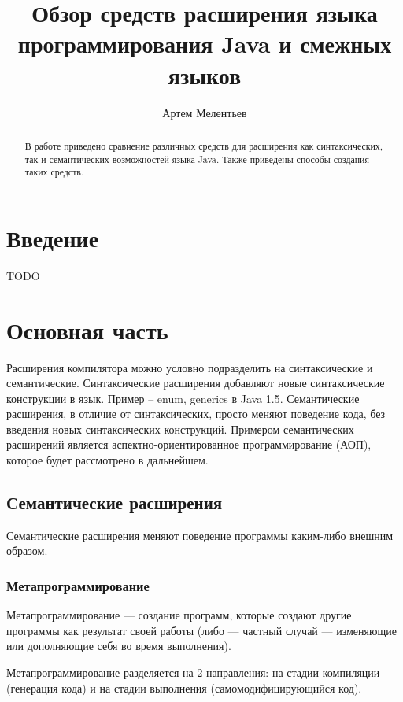 \documentclass[a4paper,12pt]{article}
\begin{document}
\title{Обзор средств расширения языка программирования Java и смежных языков}
\author{Артем Мелентьев}
\maketitle

\begin{abstract}
В работе приведено сравнение различных средств для расширения как
синтаксических, так и семантических возможностей языка Java. Также приведены
способы создания таких средств.
\end{abstract}

\tableofcontents

\section{Введение}

TODO

\section{Основная часть}

Расширения компилятора можно условно подразделить на синтаксические и
семантические. Синтаксические расширения добавляют новые синтаксические
конструкции в язык. Пример – enum, generics в Java 1.5. Семантические
расширения, в отличие от синтаксических, просто меняют поведение кода, без
введения новых синтаксических конструкций. Примером семантических расширений
является аспектно-ориентированное программирование (АОП), которое будет
рассмотрено в дальнейшем.

\subsection{Семантические расширения}

Семантические расширения меняют поведение программы каким-либо внешним образом.

\subsubsection{Метапрограммирование}
Метапрограммирование — создание программ, которые создают другие программы как
результат своей работы (либо — частный случай — изменяющие или дополняющие себя
во время выполнения).

Метапрограммирование разделяется на 2 направления: на стадии
компиляции (генерация кода) и на стадии выполнения (самомодифицирующийся код).
\end{document}
